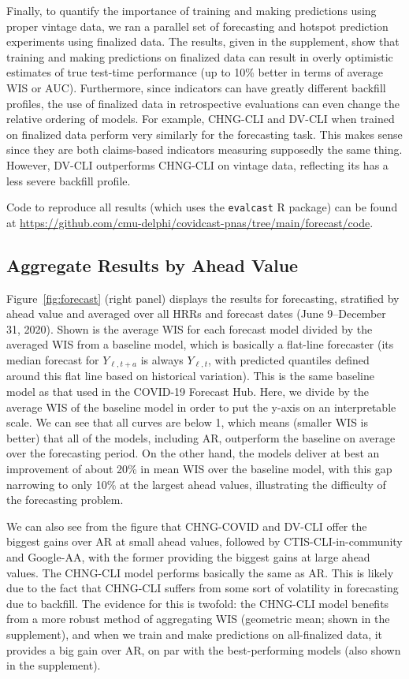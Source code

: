 \documentclass[9pt,twocolumn,twoside,lineno]{pnas-new}
\begin{document}
Finally, to quantify the importance of training and making predictions using
proper vintage data, we ran a parallel set of forecasting and hotspot prediction 
experiments using finalized data. The results, given in the supplement, show
that training and making predictions on finalized data can result in overly
optimistic estimates of true test-time performance (up to 10\% better in terms
of average WIS or AUC). Furthermore, since indicators can have greatly different
backfill profiles, the use of finalized data in retrospective evaluations can
even change the relative ordering of models.  For example, CHNG-CLI and DV-CLI
when trained on finalized data perform very similarly for the forecasting task.
This makes sense since they are both claims-based indicators measuring
supposedly the same thing.  However, DV-CLI outperforms CHNG-CLI on vintage
data, reflecting its has a less severe backfill profile.

Code to reproduce all results (which uses the \texttt{evalcast} R package) can 
be found at
\url{https://github.com/cmu-delphi/covidcast-pnas/tree/main/forecast/code}. 

\subsection{Aggregate Results by Ahead Value}

Figure~\ref{fig:forecast} (right panel) displays the results for forecasting, stratified by
ahead value and averaged over all HRRs and forecast dates (June 9--December 31,
2020).  Shown is the average WIS for each forecast model divided by the averaged
WIS from a baseline model, which is basically a flat-line forecaster (its
median forecast for $Y_{\ell,t+a}$ is always $Y_{\ell,t}$, with predicted
quantiles defined around this flat line based on historical variation). This is
the same baseline model as that used in the COVID-19 Forecast Hub.  Here, we  
divide by the average WIS of the baseline model in order to put the y-axis on an 
interpretable scale.  We can see that all curves are below 1, which means
(smaller WIS is better) that all of the models, including AR, outperform the
baseline on average over the forecasting period.  On the other hand, the models 
deliver at best an improvement of about 20\% in mean WIS over the baseline
model, with this gap narrowing to only 10\% at the largest ahead values,
illustrating the difficulty of the forecasting problem.   

We can also see from the figure that CHNG-COVID and DV-CLI offer the biggest
gains over AR at small ahead values, followed by CTIS-CLI-in-community and
Google-AA, with the former providing the biggest gains at large ahead values.
The CHNG-CLI model performs basically the same as AR.  This is likely due to the
fact that CHNG-CLI suffers from some sort of volatility in forecasting due to
backfill.  The evidence for this is twofold: the CHNG-CLI model benefits from a
more robust method of aggregating WIS (geometric mean; shown in the supplement),
and when we train and make predictions on all-finalized data, it provides a big
gain over AR, on par with the best-performing models (also shown in the
supplement).
\end{document}
